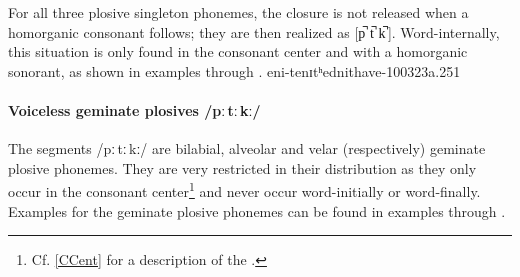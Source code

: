 For all three plosive singleton phonemes, the closure is not released when a homorganic consonant %
follows; they are then realized as [p̚ t̚ k̚\,]. Word-internally, this situation is only found in the consonant center and with a homorganic sonorant, as shown in examples  through . 
{eni-t}{enɪtʰ}{ednit}{have-}{100323a}{.251}


\paragraph{Voiceless geminate plosives /pː\,tː\,kː/}
The segments /pː\,tː\,kː/ are bilabial, alveolar and velar (respectively) geminate plosive phonemes. They are very restricted in their distribution as they only occur in the consonant center\footnote{Cf. \ref{CCent} for a description of the .} %
and never occur word-initially or word-finally. %
Examples for the geminate plosive phonemes can be found in examples  through .

